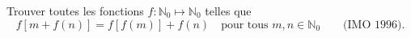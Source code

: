 Trouver toutes les fonctions $f : \mathbb{N}_0 \mapsto \mathbb{N}_0$ telles que
\[ f[m + f(n)] = f[f(m)] + f(n) \quad\text{pour tous } m, n \in \mathbb{N}_0 \qquad \text{(IMO 1996).} \]
